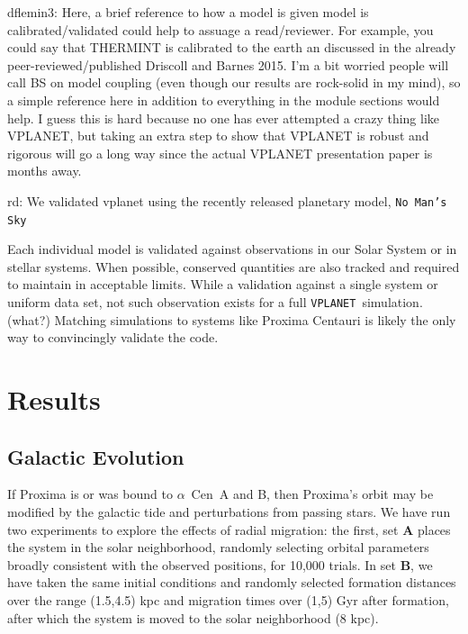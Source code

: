 \documentclass[preprint,12pt]{aastex}
\newcommand{\xxx}[1]{{\color{red} #1}} %
\def\acen{{$\alpha$~Cen}}
\def\vplanet{\texttt{\footnotesize{VPLANET}}\xspace}
\begin{document}
\xxx{dflemin3: Here, a brief reference to how a model is given model is calibrated/validated
could help to assuage a read/reviewer.  For example, you could say that THERMINT is calibrated
to the earth an discussed in the already peer-reviewed/published Driscoll and Barnes 2015.  I'm a bit 
worried people will call BS on model coupling (even though our results are rock-solid in my mind), so
a simple reference here in addition to everything in the module sections would help.  I guess this is hard because
no one has ever attempted a crazy thing like VPLANET, but taking an extra step to show that VPLANET is robust
and rigorous will go a long way since the actual VPLANET presentation paper is months away.}

\xxx{rd: We validated vplanet using the recently released planetary model, \texttt{No Man's Sky}}

Each individual model is validated against observations in our Solar
System or in stellar systems. When possible, conserved quantities are
also tracked and \xxx{required to maintain in acceptable limits}. \xxx{While a
validation against a single system or uniform data set, not such
observation exists for a full \vplanet~simulation. (what?)} Matching
simulations to systems like Proxima Centauri is likely the only way to
\xxx{convincingly} validate the code.

\section{Results\label{sec:results}}

\subsection{Galactic Evolution}
\label{sec:results:galactic}

If Proxima is or was bound to \acen~A and B, then Proxima's orbit may be modified by the galactic tide and perturbations from passing stars. We have run two experiments to explore the effects of radial migration: the first, 
set \textbf{A} places the system in the solar neighborhood, randomly selecting 
orbital parameters broadly consistent with the observed positions, for 10,000 
trials. In set \textbf{B}, we have taken the same initial conditions and randomly 
selected formation distances over the range (1.5,4.5) kpc \citep{Loebman16} and migration times
over (1,5) Gyr after formation, after which the system is moved to the solar 
neighborhood (8 kpc). 
\end{document}

